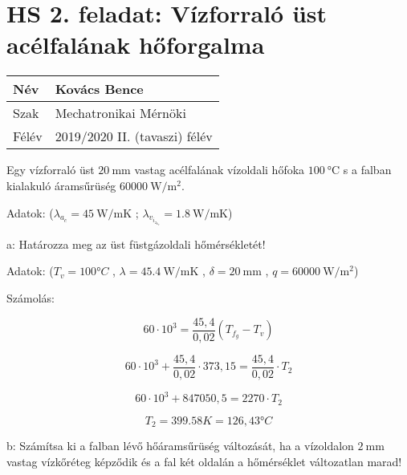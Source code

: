 \section*{HS 2. feladat: Vízforraló üst acélfalának hőforgalma}

\begin{tabular}{ | p{2cm} | p{14cm} | } 
	\hline
	Név & Kovács Bence \\ 
	\hline
	Szak &  Mechatronikai Mérnöki\\
	\hline
	Félév & 2019/2020 II. (tavaszi) félév \\ 
	\hline
\end{tabular}
\vspace{0.5cm}


Egy vízforraló üst $\SI{20}{\milli\meter}$ vastag acélfalának vízoldali hőfoka $\SI{100}{\celsius}$ s a falban kialakuló áramsűrüség $\SI{60000}{\watt\per\meter^2}$.

\noindent Adatok:    ($\lambda_a_c = \SI{45}{\watt\per\meter\K}$ ;
                     $\lambda_v_i_z_k_o = \SI{1,8}{\watt\per\meter\K}$)
                     
\vspace{1mm}

\vspace{1mm}
\noindent a: Határozza meg az üst füstgázoldali hőmérsékletét!


Adatok:
($ T_v = 100 °C $ , $\lambda = \SI{45.4}{\watt\per\meter\K}$ , $\delta = \SI{20}{\milli\meter}$ ,  $ q = \SI{60000}{\watt\per\meter^2} $)

Számolás:

\begin{equation}
60 \cdot 10^3 = \frac{45,4}{0,02} (T_f_g - T_v)
\end{equation}

\begin{equation}
60 \cdot 10^3 + \frac{45,4}{0,02} \cdot 373,15= \frac{45,4}{0,02} \cdot T_2
\end{equation}

\begin{equation}
60 \cdot 10^3 + 847050,5 = 2270 \cdot T_2
\end{equation}

\begin{equation}
T_2 = 399.58K = 126,43 °C
\end{equation}

\vspace{1mm}
\noindent b: Számítsa ki a falban lévő hőáramsűrüség változását, ha a vízoldalon $\SI{2}{\milli\meter}$ vastag vízkőréteg képződik és a fal két oldalán a hőmérséklet változatlan marad!

